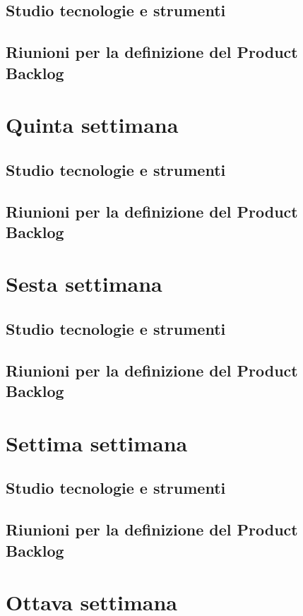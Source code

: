\subsection{Studio tecnologie e strumenti}
\subsection{Riunioni per la definizione del Product Backlog}

\section{Quinta settimana}
\subsection{Studio tecnologie e strumenti}
\subsection{Riunioni per la definizione del Product Backlog}

\section{Sesta settimana}
\subsection{Studio tecnologie e strumenti}
\subsection{Riunioni per la definizione del Product Backlog}

\section{Settima settimana}
\subsection{Studio tecnologie e strumenti}
\subsection{Riunioni per la definizione del Product Backlog}

\section{Ottava settimana}

